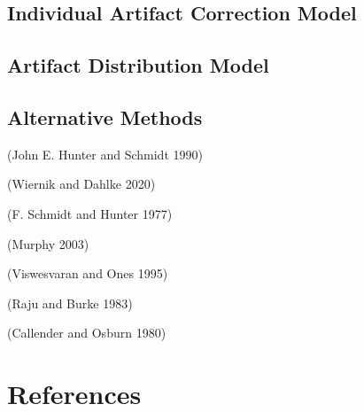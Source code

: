 \documentclass[
  letterpaper,
  DIV=11,
  numbers=noendperiod]{scrreprt}
\begin{document}
\hypertarget{individual-artifact-correction-model}{%
\section{Individual Artifact Correction
Model}\label{individual-artifact-correction-model}}

\hypertarget{artifact-distribution-model}{%
\section{Artifact Distribution
Model}\label{artifact-distribution-model}}

\hypertarget{alternative-methods}{%
\section{Alternative Methods}\label{alternative-methods}}

(John E. Hunter and Schmidt 1990)

(Wiernik and Dahlke 2020)

(F. Schmidt and Hunter 1977)

(Murphy 2003)

(Viswesvaran and Ones 1995)

(Raju and Burke 1983)

(Callender and Osburn 1980)


\hypertarget{references}{%
\chapter*{References}\label{references}}

\end{document}
